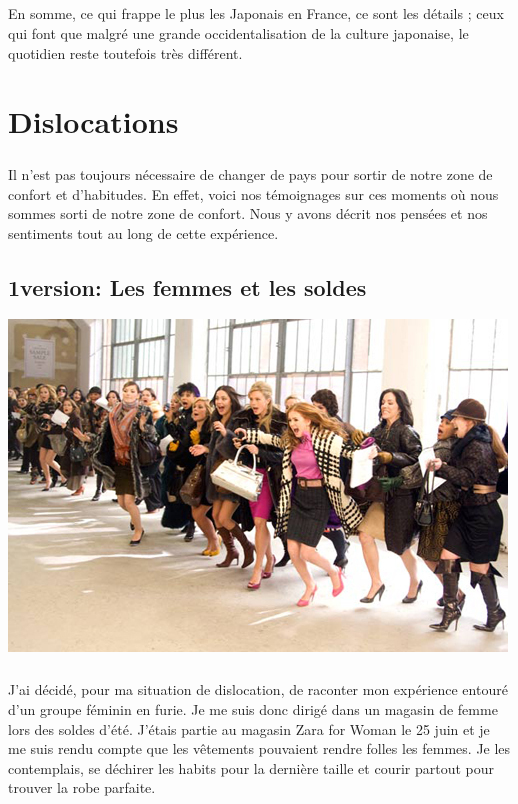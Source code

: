 \paragraph{} En somme, ce qui frappe le plus les Japonais en France, ce sont
les détails ; ceux qui font que malgré une grande occidentalisation de la
culture japonaise, le quotidien reste toutefois très différent.


\chapter{Dislocations}

\paragraph{} Il n'est pas toujours nécessaire de changer de pays pour sortir de
notre zone de confort et d'habitudes. En effet, voici nos témoignages sur ces
moments où nous sommes sorti de notre zone de confort. Nous y avons décrit nos
pensées et nos sentiments tout au long de cette expérience.

\section{1\iere version: Les femmes et les soldes}

\begin{center}
	\includegraphics[scale=0.7]{solde.jpg}
\end{center}

\paragraph{} J'ai décidé, pour ma situation de dislocation, de raconter mon
expérience entouré d'un groupe féminin en furie. Je me suis donc dirigé dans un
magasin de femme lors des soldes d'été. J'étais partie au magasin Zara for
Woman le 25 juin et je me suis rendu compte que les vêtements pouvaient rendre
folles les femmes. Je les contemplais, se déchirer les habits pour la dernière
taille et courir partout pour trouver la robe parfaite.

